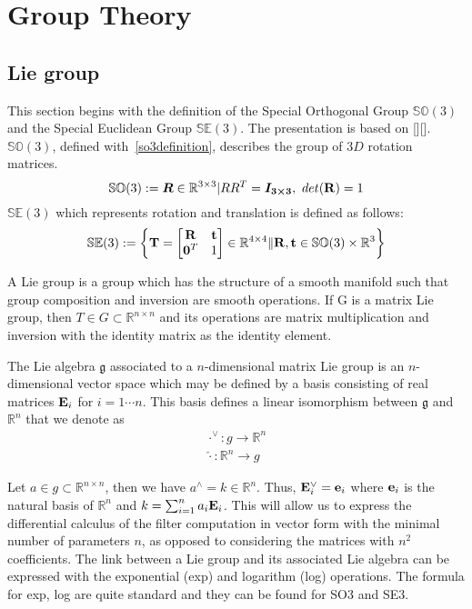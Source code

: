 \documentclass[a4paper,12pt]{report}
\begin{document}
\chapter{Group Theory}
\section{Lie group}
This section begins with the definition of the Special Orthogonal Group $\mathbb{SO}(3)$ and the Special Euclidean Group $\mathbb{SE}(3)$. The presentation is based on [][]. $\mathbb{SO}(3)$, defined with~\eqref{so3definition}, describes the group of $3D$ rotation matrices.
\begin{equation}
\mathbb{SO}(3):={\bm{R} \in \mathbb{R}^{3 \times 3}|RR^T=\bm{I_{3 \times 3}},\ det(\bold{R})=1}
\label{eq:SO3definition}
\end{equation}
$\mathbb{SE}(3)$ which represents rotation and translation is defined as follows:
\begin{equation}
\mathbb{SE}(3):=\left\lbrace
\bold{T}=\left[
\begin{matrix} 
\bold{R} & \bold{t} \\
\bold{0}^T & 1
\end{matrix}
\right] \in \mathbb{R}^{4 \times 4} \| {\bold{R}, \bold{t}} 
\in \mathbb{SO}(3) \times \mathbb{R}^3 \right\rbrace
\label{eq:SE3definition}
\end{equation}

A Lie group is a group which has the structure of a smooth manifold such that group composition and inversion are smooth operations. If G is a matrix Lie group, then $T \in G \subset \mathbb{R}^{n \times n}$ and its operations are matrix multiplication and inversion with the identity matrix as the identity element.

The Lie algebra $\mathfrak{g}$ associated to a $n$-dimensional matrix Lie group is an $n$-dimensional vector space which may be defined by a basis consisting of real matrices $\bold{E}_i$ for $i=1 \cdots n$. This basis defines a linear isomorphism between $\mathfrak{g}$ and $\mathbb{R}^n$ that we denote as 
$$
\begin{matrix}
\cdot^{\vee}: g \to \mathbb{R}^n \\ 
\hat{\cdot}: \mathbb{R}^n \to g
\end{matrix}
$$

Let $a \in g \subset \mathbb{R}^{n \times n}$, then we have $a^{\land}=k \in \mathbb{R}^n$. Thus, $\bold{E}_i^{\vee}=\bold{e}_i$ where $\bold{e}_i$ is the natural basis of $\mathbb{R}^n$ and $k=\sum_{i=1}^{n}{a_i \bold{E}_i}$. This will allow us to express the differential calculus of the filter computation in vector form with the minimal number of parameters $n$, as opposed to considering the matrices with $n^2$ coefficients. The link between a Lie group and its associated Lie algebra can be expressed with the exponential (exp) and logarithm (log) operations. The formula for exp, log are quite standard and they can be found for SO3 and SE3.
\end{document}
